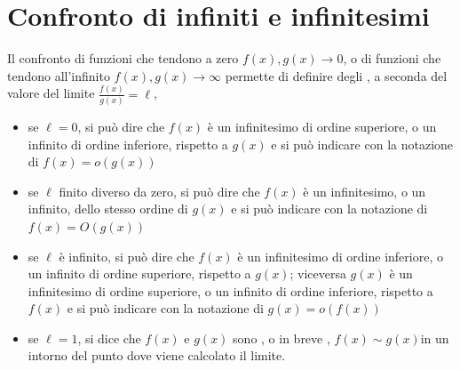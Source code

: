 \documentclass[letterpaper,10pt,italian]{jupyterBook}
\begin{document}
\section{Confronto di infiniti e infinitesimi}
\label{\detokenize{ch/infinitesimal_calculus/analysis:confronto-di-infiniti-e-infinitesimi}}\label{\detokenize{ch/infinitesimal_calculus/analysis:infinitesimal-calculus-limits-infinite-simal}}
\sphinxAtStartPar
Il confronto di funzioni che tendono a zero \(f(x), g(x) \rightarrow 0\), o di funzioni che tendono all’infinito \(f(x), g(x) \rightarrow \infty\) permette di definire degli   , a seconda del valore del limite \(\frac{f(x)}{g(x)} = \ell\),
\begin{itemize}
\item {} 
\sphinxAtStartPar
se \(\ell = 0\), si può dire che \(f(x)\) è un infinitesimo di ordine superiore, o un infinito di ordine inferiore, rispetto a \(g(x)\) e si può indicare con la notazione di  \(f(x) = o \left(g(x) \right)\)

\item {} 
\sphinxAtStartPar
se \(\ell\) finito diverso da zero, si può dire che \(f(x)\) è un infinitesimo, o un infinito,  dello stesso ordine di \(g(x)\) e si può indicare con la notazione di  \(f(x) = O \left(g(x) \right)\)

\item {} 
\sphinxAtStartPar
se \(\ell\) è infinito, si può dire che \(f(x)\) è un infinitesimo di ordine inferiore, o un infinito di ordine superiore, rispetto a \(g(x)\); viceversa \(g(x)\) è un infinitesimo di ordine superiore, o un infinito di ordine inferiore, rispetto a \(f(x)\) e si può indicare con la notazione di  \(g(x) = o \left(f(x) \right)\)

\item {} 
\sphinxAtStartPar
se \(\ell = 1\), si dice che \(f(x)\) e \(g(x)\) sono , o in breve , \(f(x) \sim g(x)\)in un intorno del punto dove viene calcolato il limite.

\end{itemize}
\end{document}

